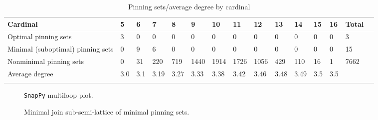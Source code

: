 \documentclass{article}%
\begin{document}
\begin{table}[ht]
	\caption{Pinning sets/average degree by cardinal}
	\centering
	\renewcommand{\arraystretch}{1.5}
	\begin{tabularx}{\textwidth}{lXXXXXXXXXXXXXX}
		\toprule
			Cardinal & 5 & 6 & 7 & 8 & 9 & 10 & 11 & 12 & 13 & 14 & 15 & 16 & Total\\
			\hline
			Optimal pinning sets & 3 & 0 & 0 & 0 & 0 & 0 & 0 & 0 & 0 & 0 & 0 & 0 & 3 \\
			Minimal (suboptimal) pinning sets & 0 & 9 & 6 & 0 & 0 & 0 & 0 & 0 & 0 & 0 & 0 & 0 & 15 \\
			Nonminimal pinning sets & 0 & 31 & 220 & 719 & 1440 & 1914 & 1726 & 1056 & 429 & 110 & 16 & 1 & 7662 \\
			Average degree & 3.0 & 3.1 & 3.19 & 3.27 & 3.33 & 3.38 & 3.42 & 3.46 & 3.48 & 3.49 & 3.5 & 3.5 &  \\
		\bottomrule \\ 
	\end{tabularx}
\end{table}

\begin{multicols}{2}
\begin{figure}[H]
\centering

\caption{\texttt{SnapPy} multiloop plot.}
\label{fig:tex/img/[[24, 28, 1, 25], [25, 11, 26, 12], [8, 23, 9, 24], [9, 27, 10, 28], [1, 10, 2, 11], [26, 2, 27, 3], [12, 17, 13, 18], [18, 7, 19, 8], [22, 3, 23, 4], [16, 21, 17, 22], [13, 6, 14, 7], [19, 14, 20, 15.svg}
\end{figure}
\columnbreak

\begin{figure}[H]
\centering
\scalebox{0.8}{}
\caption{Minimal join sub-semi-lattice of minimal pinning sets.}
\label{fig:tex/img/[[24, 28, 1, 25], [25, 11, 26, 12], [8, 23, 9, 24], [9, 27, 10, 28], [1, 10, 2, 11], [26, 2, 27, 3], [12, 17, 13, 18], [18, 7, 19, 8], [22, 3, 23, 4], [16, 21, 17, 22], [13, 6, 14, 7], [19, 14, 20, 15.pgf}
\end{figure}
\end{multicols}
\end{document}
